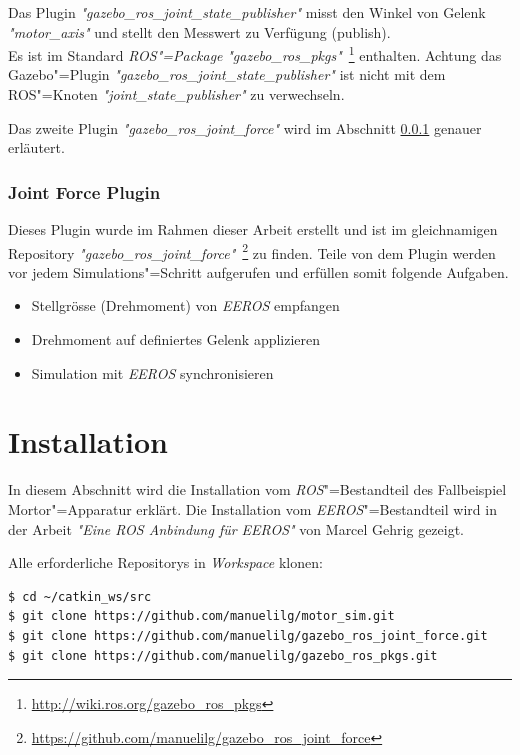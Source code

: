 Das Plugin \textit{\textit{"}gazebo\_ros\_joint\_state\_publisher\textit{"}} misst den Winkel von Gelenk \textit{\textit{"}motor\_axis\textit{"}} und stellt den Messwert zu Verfügung (publish).\\
Es ist im Standard \textit{ROS"=Package} \textit{\textit{"}gazebo\_ros\_pkgs\textit{"}}~\footnote{\url{http://wiki.ros.org/gazebo_ros_pkgs}} enthalten.
Achtung das Gazebo"=Plugin \textit{\textit{"}gazebo\_ros\_joint\_state\_publisher\textit{"}} ist nicht mit dem ROS"=Knoten \textit{\textit{"}joint\_state\_publisher\textit{"}} zu verwechseln.

Das zweite Plugin \textit{\textit{"}gazebo\_ros\_joint\_force\textit{"}} wird im Abschnitt \ref{chap:joint-force-plugin} genauer erläutert.

\subsubsection{Joint Force Plugin}
\label{chap:joint-force-plugin}
Dieses Plugin wurde im Rahmen dieser Arbeit erstellt und ist im gleichnamigen Repository \textit{\textit{"}gazebo\_ros\_joint\_force\textit{"}}~\footnote{\url{https://github.com/manuelilg/gazebo_ros_joint_force}} zu finden.
Teile von dem Plugin werden vor jedem Simulations"=Schritt aufgerufen und erfüllen somit folgende Aufgaben.
\begin{itemize}
\item Stellgrösse (Drehmoment) von \textit{EEROS} empfangen
\item Drehmoment auf definiertes Gelenk applizieren
\item Simulation mit \textit{EEROS} synchronisieren
\end{itemize}

\section{Installation}
In diesem Abschnitt wird die Installation vom \textit{ROS}"=Bestandteil des Fallbeispiel Mortor"=Apparatur erklärt.
Die Installation vom \textit{EEROS}"=Bestandteil wird in der Arbeit \textit{\textit{"}Eine ROS Anbindung für EEROS\textit{"}} von Marcel Gehrig gezeigt.

Alle erforderliche Repositorys in \textit{Workspace} klonen:
\begin{lstlisting}
$ cd ~/catkin_ws/src
$ git clone https://github.com/manuelilg/motor_sim.git
$ git clone https://github.com/manuelilg/gazebo_ros_joint_force.git
$ git clone https://github.com/manuelilg/gazebo_ros_pkgs.git
\end{lstlisting} 

